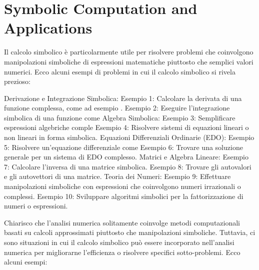 
\chapter{Symbolic Computation and Applications}
\label{chapter:symbolic_computation}

Il calcolo simbolico è particolarmente utile per risolvere problemi che coinvolgono manipolazioni simboliche di espressioni matematiche piuttosto che semplici valori numerici. Ecco alcuni esempi di problemi in cui il calcolo simbolico si rivela prezioso:

Derivazione e Integrazione Simbolica:
Esempio 1: Calcolare la derivata di una funzione complessa, come ad esempio .
Esempio 2: Eseguire l'integrazione simbolica di una funzione come
Algebra Simbolica:
Esempio 3: Semplificare espressioni algebriche comple
Esempio 4: Risolvere sistemi di equazioni lineari o non lineari in forma simbolica.
Equazioni Differenziali Ordinarie (EDO):
Esempio 5: Risolvere un'equazione differenziale come
Esempio 6: Trovare una soluzione generale per un sistema di EDO complesso.
Matrici e Algebra Lineare:
Esempio 7: Calcolare l'inversa di una matrice simbolica.
Esempio 8: Trovare gli autovalori e gli autovettori di una matrice.
Teoria dei Numeri:
Esempio 9: Effettuare manipolazioni simboliche con espressioni che coinvolgono numeri irrazionali o complessi.
Esempio 10: Sviluppare algoritmi simbolici per la fattorizzazione di numeri o espressioni.


Chiarisco che l'analisi numerica solitamente coinvolge metodi computazionali basati su calcoli approssimati piuttosto che manipolazioni simboliche. Tuttavia, ci sono situazioni in cui il calcolo simbolico può essere incorporato nell'analisi numerica per migliorarne l'efficienza o risolvere specifici sotto-problemi. Ecco alcuni esempi:

